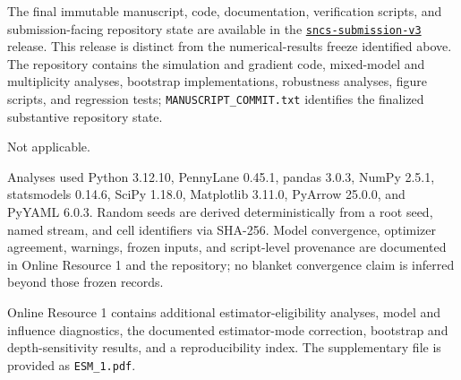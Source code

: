 \documentclass[pdflatex,sn-basic,Numbered]{sn-jnl}
\begin{document}
 The final immutable manuscript, code, documentation, verification scripts, and submission-facing repository state are available in the \href{https://github.com/Brandon-Shen/few-qubit-qnn-snr/releases/tag/sncs-submission-v3}{\texttt{sncs-submission-v3}} release. This release is distinct from the numerical-results freeze identified above. The repository contains the simulation and gradient code, mixed-model and multiplicity analyses, bootstrap implementations, robustness analyses, figure scripts, and regression tests; \texttt{MANUSCRIPT\_COMMIT.txt} identifies the finalized substantive repository state.

 Not applicable.

 Analyses used Python 3.12.10, PennyLane 0.45.1, pandas 3.0.3, NumPy 2.5.1, statsmodels 0.14.6, SciPy 1.18.0, Matplotlib 3.11.0, PyArrow 25.0.0, and PyYAML 6.0.3. Random seeds are derived deterministically from a root seed, named stream, and cell identifiers via SHA-256. Model convergence, optimizer agreement, warnings, frozen inputs, and script-level provenance are documented in Online Resource 1 and the repository; no blanket convergence claim is inferred beyond those frozen records.

 Online Resource 1 contains additional estimator-eligibility analyses, model and influence diagnostics, the documented estimator-mode correction, bootstrap and depth-sensitivity results, and a reproducibility index. The supplementary file is provided as \texttt{ESM\_1.pdf}.


\end{document}
